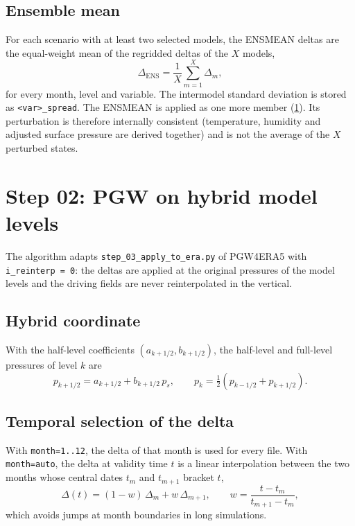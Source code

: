 \documentclass[11pt,a4paper]{article}
\newcommand{\code}[1]{\texttt{#1}}
\begin{document}
\subsection{Ensemble mean}

For each scenario with at least two selected models, the ENSMEAN deltas are
the equal-weight mean of the regridded deltas of the $X$ models,
\begin{equation}
  \Delta_{\mathrm{ENS}} = \frac{1}{X}\sum_{m=1}^{X} \Delta_m ,
\end{equation}
for every month, level and variable. The intermodel standard deviation is
stored as \code{<var>\_spread}. The ENSMEAN is applied as one more member
(\cref{sec:step02}). Its perturbation is therefore internally consistent
(temperature, humidity and adjusted surface pressure are derived together)
and is not the average of the $X$ perturbed states.

\section{Step 02: PGW on hybrid model levels}
\label{sec:step02}

The algorithm adapts \code{step\_03\_apply\_to\_era.py} of PGW4ERA5
\citep{Brogli2023} with \code{i\_reinterp = 0}: the deltas are applied at the
original pressures of the model levels and the driving fields are never
reinterpolated in the vertical.

\subsection{Hybrid coordinate}

With the half-level coefficients $(a_{k+1/2}, b_{k+1/2})$, the half-level and
full-level pressures of level $k$ are \citep{ECMWF_IFS_III}
\begin{equation}
  p_{k+1/2} = a_{k+1/2} + b_{k+1/2}\, p_s, \qquad
  p_k = \tfrac{1}{2}\left(p_{k-1/2} + p_{k+1/2}\right).
\end{equation}

\subsection{Temporal selection of the delta}

With \code{month=1..12}, the delta of that month is used for every file. With
\code{month=auto}, the delta at validity time $t$ is a linear interpolation
between the two months whose central dates $t_m$ and $t_{m+1}$ bracket $t$,
\begin{equation}
  \Delta(t) = (1 - w)\,\Delta_m + w\,\Delta_{m+1}, \qquad
  w = \frac{t - t_m}{t_{m+1} - t_m},
\end{equation}
which avoids jumps at month boundaries in long simulations.
\end{document}
